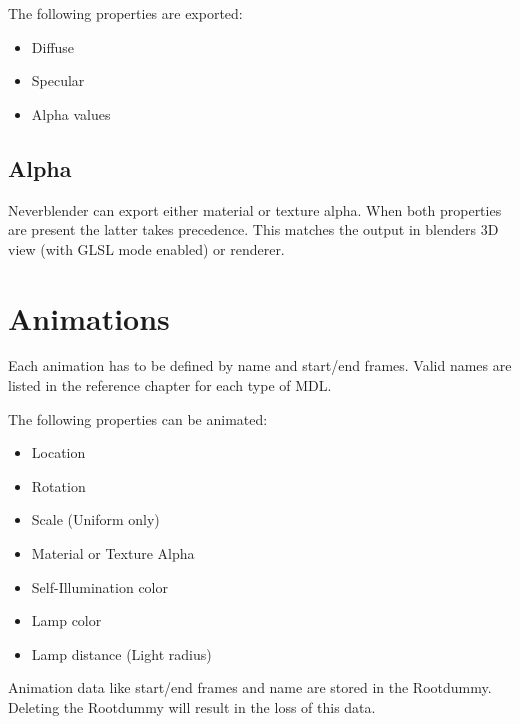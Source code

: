 The following properties are exported:
\begin{itemize}
    \item Diffuse
    \item Specular
    \item Alpha values
\end{itemize}

\subsection*{Alpha}
Neverblender can export either material or texture alpha. When both properties are present 
the latter takes precedence. This matches the output in blenders 3D view (with GLSL mode enabled) 
or renderer.

\section{Animations}
Each animation has to be defined by name and start/end frames. Valid names 
are listed in the reference chapter for each type of MDL.

The following properties can be animated:
\begin{itemize}
    \item Location
    \item Rotation
    \item Scale (Uniform only)
    \item Material or Texture Alpha
    \item Self-Illumination color
    \item Lamp color
    \item Lamp distance (Light radius)
\end{itemize}
Animation data like start/end frames and name are stored in the Rootdummy. Deleting the Rootdummy will result in
the loss of this data.